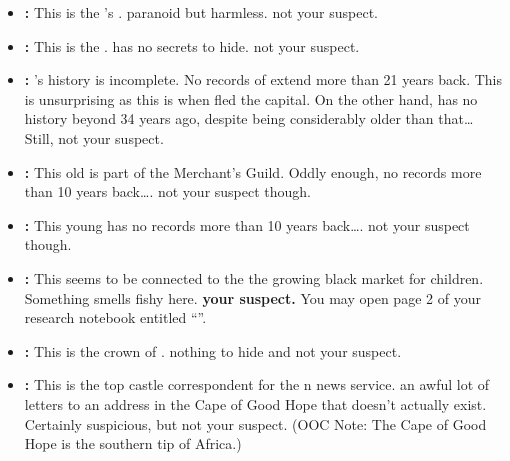 \documentclass[green]{NeptuneBall}
\begin{document}
\begin{itemize}
	\item \textbf{\cPlant{\full}:} This is the \cKing{\King}'s \cPlant{\sibling}. \cPlant{\They} \cPlant{\are} paranoid but harmless. \cPlant{\They} \cPlant{\are} not your suspect.
	
	\item \textbf{\cKing{\full}:} This is the \cKing{\King}. \cKing{} has no secrets to hide. \cKing{\They} \cKing{\are} not your suspect.
	
	\item  \textbf{\cQueen{\full}:} \cQueen{}'s history is incomplete. No records of \cQueen{\them} extend more than 21 years back. This is unsurprising as this is when \cQueen{\they} fled the capital. On the other hand, \cAthena{} has no history beyond 34 years ago, despite being considerably older than that\ldots{} Still, \cQueen{\they} \cQueen{\are} not your suspect.
	
	\item \textbf{\cSlave{\full}:} This old \cSlave{\mer} is part of the Merchant's Guild. Oddly enough, \cSlave{\they} \cSlave{\have} no records more than 10 years back\ldots{}. \cSlave{\They} \cSlave{\are} not your suspect though.
	
	\item \textbf{\cWitch{\full}:} This young \cWitch{\mer} has no records more than 10 years back\ldots{}. \cWitch{\They} \cWitch{\are} not your suspect though.
	
	\item \textbf{\cPriest{\full}:} This \cPriest{\mer} seems to be connected to the the growing black market for children. Something smells fishy here. {\bf \cPriest{\They} \cPriest{\are} your suspect.} You may open page 2 of your research notebook entitled ``\nMafia{\MYname}''.
	
	\item \textbf{\cPrincess{\full}:} This is the crown \cPrincess{\Prince} of \pAtlantis{}. \cPrincess{\They} \cPrincess{\have} nothing to hide and \cPrincess{\are} not your suspect.
	
		\item \textbf{\cReporter{\full}:} This is the top castle correspondent for the \pAtlantis{}n news service. \cReporter{\They}  an awful lot of letters to an address in the Cape of Good Hope that doesn't actually exist. Certainly suspicious, but \cReporter{\they} \cReporter{\are} not your suspect. (OOC Note: The Cape of Good Hope is the southern tip of Africa.)
	

\end{itemize}
\end{document}

